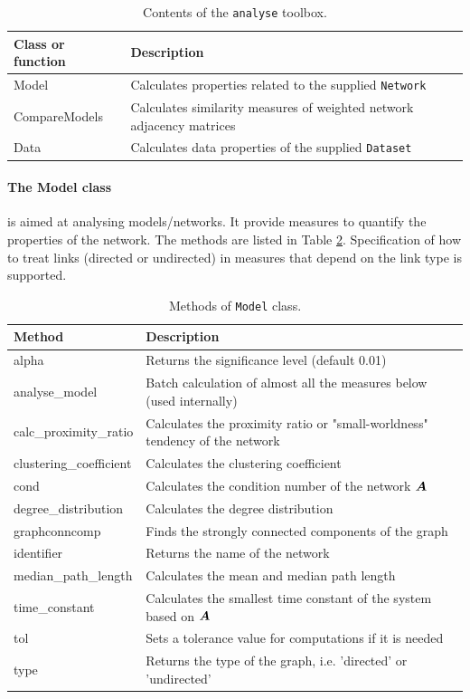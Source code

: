 \begin{bibunit}
\begin{table}[htb]
\caption{\label{tab:analyse}
Contents of the \texttt{analyse} toolbox.}
\centering
\begin{tabular}{|l|p{10cm}|}
\hline
Class or function & Description\\
\hline
Model & Calculates properties related to the supplied \texttt{Network}\\
CompareModels & Calculates similarity measures of weighted network adjacency matrices\\
Data & Calculates data properties of the supplied \texttt{Dataset}\\
\hline
\end{tabular}
\end{table}


\paragraph{The Model class}
\label{sec:model_class}
is aimed at analysing models/networks.
It provide measures to quantify the properties of the network. The methods are listed in Table \ref{tab:model}.
Specification of how to treat links (directed or undirected) in measures that depend on the link type is supported.

\begin{table}[htb]
\caption{\label{tab:model}
Methods of \texttt{Model} class.}
\centering
\begin{tabular}{|l|p{10cm}|}
\hline
Method & Description\\
\hline
alpha & Returns the significance level (default 0.01)\\
analyse\_model & Batch calculation of almost all the measures below (used internally)\\
calc\_proximity\_ratio & Calculates the proximity ratio or "small-worldness" tendency of the network\\
clustering\_coefficient & Calculates the clustering coefficient\\
cond & Calculates the condition number of the network \({\boldsymbol{A}}\)\\
degree\_distribution & Calculates the degree distribution\\
graphconncomp & Finds the strongly connected components of the graph\\
identifier & Returns the name of the network\\
median\_path\_length & Calculates the mean and median path length\\
time\_constant & Calculates the smallest time constant of the system based on \({\boldsymbol{A}}\)\\
tol & Sets a tolerance value for computations if it is needed\\
type & Returns the type of the graph, i.e. 'directed' or 'undirected'\\
\hline
\end{tabular}
\end{table}


\end{bibunit}
